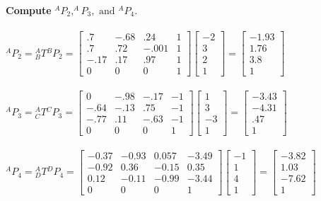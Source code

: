 \documentclass{article}
\begin{document}
\newpage
\textbf{Compute} $^AP_2, ^AP_3, \text{ and } {}^AP_4$.\\\\
$^AP_2={}^A_BT{}^BP_2=\begin{bmatrix}
.7 & -.68 &.24 & 1\\
.7 & .72 & -.001 & 1\\
-.17 & .17 & .97 & 1\\
0 & 0 & 0 & 1
\end{bmatrix}\begin{bmatrix}
-2\\
3\\
2\\
1
\end{bmatrix}=\begin{bmatrix}
-1.93\\
1.76\\
3.8\\
1
\end{bmatrix}$\\\\
$^AP_3={}^A_CT{}^CP_3=\begin{bmatrix}
0 &  -.98 & -.17 & -1\\
-.64 & -.13 & .75 & -1\\
-.77 & .11 & -.63 & -1\\
0 & 0 & 0 & 1
\end{bmatrix}\begin{bmatrix}
1\\
3\\
-3\\
1
\end{bmatrix}=\begin{bmatrix}
-3.43\\
-4.31\\
.47\\
1
\end{bmatrix}$\\\\
$^AP_4={}^A_DT{}^DP_4=\begin{bmatrix}
-0.37 & -0.93 & 0.057 & -3.49\\
-0.92 & 0.36 & -0.15 & 0.35\\
0.12 & -0.11 & -0.99 & -3.44\\
0 & 0 & 0 & 1        
\end{bmatrix}\begin{bmatrix}
-1\\
1\\
4\\
1
\end{bmatrix}=\begin{bmatrix}
-3.82\\
1.03\\
-7.62\\
1
\end{bmatrix}$\\\\
\end{document}
